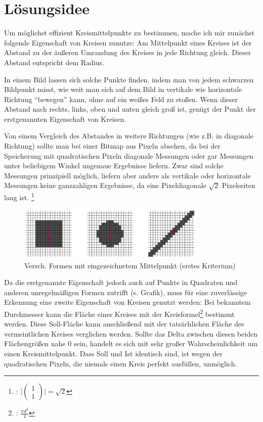 \section{Lösungsidee}
Um möglichst effizient Kreismittelpunkte zu bestimmen, mache ich mir zunächst folgende Eigenschaft von Kreisen zunutze: Am Mittelpunkt eines Kreises ist der Abstand zu der äußeren Umrandung des Kreises in jede Richtung gleich. Dieser Abstand entspricht dem Radius.

In einem Bild lassen sich solche Punkte finden, indem man von jedem schwarzen Bildpunkt misst, wie weit man sich auf dem Bild in vertikale wie horizontale Richtung "`bewegen"' kann, ohne auf ein weißes Feld zu stoßen. Wenn dieser Abstand nach rechts, links, oben und unten gleich groß ist, genügt der Punkt der erstgenannten Eigenschaft von Kreisen. 

Von einem Vergleich des Abstandes in weitere Richtungen (wie z.B. in diagonale Richtung) sollte man bei einer Bitmap aus Pixeln absehen, da bei der Speicherung mit quadratischen Pixeln diagonale Messungen oder gar Messungen unter beliebigem Winkel ungenaue Ergebnisse liefern. Zwar sind solche Messungen prinzipiell möglich, liefern aber anders als vertikale oder horizontale Messungen keine ganzzahligen Ergebnisse, da eine Pixeldiagonale \(\sqrt{2}\) Pixelseiten lang ist.
\footnote{: \( \vert \begin{pmatrix}1\\1\end{pmatrix} \vert = \sqrt{2}\)}

\begin{figure}[!ht]
	\centering	
	\includegraphics[width=0.8\textwidth]{Grafiken/durchmesservergleich}
	\caption{Versch. Formen mit eingezeichnetem Mittelpunkt (erstes Kriterium)}
\end{figure}

Da die erstgenannte Eigenschaft jedoch auch auf Punkte in Quadraten und anderen unregelmäßigen Formen zutrifft (s. Grafik), muss für eine zuverlässige Erkennung eine zweite Eigenschaft von Kreisen genutzt werden: Bei bekanntem Durchmesser kann die Fläche eines Kreises mit der Kreisformel\footnote{: \(\frac{\pi d^2}{4}\)} bestimmt werden. Diese Soll-Fläche kann anschließend mit der tatsächlichen Fläche des vermeintlichen Kreises verglichen werden. Sollte das Delta zwischen diesen beiden Flächengrößen nahe 0 sein, handelt es sich mit sehr großer Wahrscheinlichkeit um einen Kreismittelpunkt. Dass Soll und Ist identisch sind, ist wegen der quadratischen Pixeln, die niemals einen Kreis perfekt ausfüllen, unmöglich.


